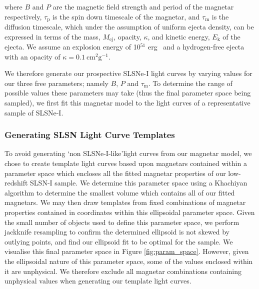 \documentclass[a4paper,fleqn,usenatbib]{mnras}
\newcommand{\angus}[1]{\color{JungleGreen}#1\color{black}}
\begin{document}
where $B$ and $P$ are the magnetic field strength and period of the magnetar respectively, $\tau_{\mathrm{p}}$ is the spin down timescale of the magnetar, and $\tau_{\mathrm{m}}$ is the diffusion timescale, which under the assumption of uniform ejecta density, can be expressed in terms of the mass, $M_{\mathrm{ej}}$, opacity, $\kappa$, and kinetic energy, $E_{\mathrm{k}}$ of the ejecta. We assume an explosion energy of \angus{10$^{51}$ erg~} and a hydrogen-free ejecta with an opacity of $\kappa = 0.1~\mathrm{cm}^{2} \mathrm{g}^{-1}$. 

We therefore generate our prospective SLSNe-I light curves by varying values for our three free parameters; namely $B$, $P$ and $\tau_{\mathrm{m}}$. To determine the range of possible values these parameters may take (thus the final parameter space being sampled), we first fit this magnetar model to the light curves of a representative sample of SLSNe-I.   

\subsubsection{Generating SLSN Light Curve Templates}

To avoid generating \lq non SLSNe-I-like\rq light curves from our magnetar model, we chose to create template light curves based upon magnetars contained within a parameter space which encloses all the fitted magnetar properties of our low-redshift SLSN-I sample. We determine this parameter space using a Khachiyan algorithm \citep{Aspvall1980,Khachiyan1980} to determine the smallest volume which contains all of our fitted magnetars. We may then draw templates from fixed combinations of magnetar properties contained in coordinates within this ellipsoidal parameter space. Given the small number of objects used to define this parameter space, we perform jackknife resampling to confirm the determined ellipsoid is not skewed by outlying points, and find our ellipsoid fit to be optimal for the sample. We visualise this final parameter space in Figure \ref{fig:param_space}. However, given the ellipsoidal nature of this parameter space, some of the values enclosed within it are unphysical. We therefore exclude all magnetar combinations containing unphysical values when generating our template light curves. 
\end{document}

